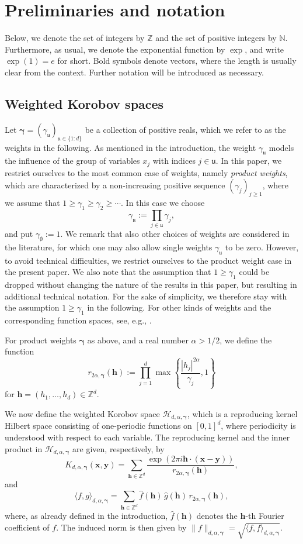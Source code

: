 \documentclass[pdflatex,sn-basic,Numbered]{sn-jnl}%
\newcommand{\bsh}{\boldsymbol{h}}
\newcommand{\bsx}{\boldsymbol{x}}
\newcommand{\bsy}{\boldsymbol{y}}
\newcommand{\bsgamma}{\boldsymbol{\gamma}}
\newcommand{\NN}{\mathbb{N}}
\newcommand{\ZZ}{\mathbb{Z}}
\newcommand{\Hcal}{\mathcal{H}}
\newcommand{\abs}[1]{\left\vert#1\right\vert}
\theoremstyle{thmstyleone}%
\theoremstyle{thmstyletwo}%
\begin{document}
\section{Preliminaries and notation}\label{sec:preliminaries}

Below, we denote the set of integers by $\ZZ$ and the set of positive integers by $\NN$. Furthermore, as usual, we denote the exponential function by $\exp$, and write $\exp(1)=e$ for short. Bold symbols denote vectors, where the length is usually clear from the context. Further notation will be introduced as necessary.

\subsection{Weighted Korobov spaces}
Let $\bsgamma=(\gamma_{\mathfrak{u}})_{\mathfrak{u}\in\{1{:}d\}}$ be a collection of positive reals, which we refer to as the weights in the following. As mentioned in the introduction, the weight $\gamma_{\mathfrak{u}}$ models the influence of the group of variables $x_j$ with indices $j\in \mathfrak{u}$. In this paper, we restrict ourselves to the most common case of weights, namely \textit{product weights}, 
which are characterized by a non-increasing positive sequence $(\gamma_j)_{j\ge 1}$, where we assume that $1\ge \gamma_1 \ge \gamma_2 \ge \cdots$. In this case we choose 
\[
\gamma_{\mathfrak{u}}:=\prod_{j\in \mathfrak{u}} \gamma_j,
\]
and put $\gamma_{\emptyset}:=1$.
We remark that also other choices of weights are considered in the literature, for which one may also allow single weights $\gamma_{\mathfrak{u}}$ to be zero. However, to avoid technical difficulties, we restrict ourselves to the product weight case in the present paper. We also note that the assumption that $1\ge \gamma_1$ could be dropped without changing the nature of the results in this paper, but resulting in additional technical notation. For the sake of simplicity, we therefore stay with the assumption $1\ge \gamma_1$ in the following. For other kinds of weights and the corresponding function spaces, see, e.g., \cite{dick2022lattice, kuo2013high}.

For product weights $\bsgamma$ as above, and a real number $\alpha>1/2$, we define the function
\[
r_{2\alpha,\bsgamma} (\bsh):=\prod_{j=1}^d \max \left\{\frac{\abs{h_j}^{2\alpha}}{\gamma_j}, 1\right\}
\]
for $\bsh=(h_1,\ldots,h_d)\in \ZZ^d$. 

We now define the weighted Korobov space $\Hcal_{d,\alpha,\bsgamma}$, which is a reproducing kernel Hilbert space consisting of one-periodic functions on $[0,1]^d$, where periodicity is understood with respect to each variable. The reproducing kernel and the inner product in $\Hcal_{d,\alpha,\bsgamma}$ are given, respectively, by
\[ K_{d, \alpha, \bsgamma}(\bsx, \bsy)=\sum_{\bsh \in \ZZ^{d}} \frac{\exp (2 \pi i \bsh \cdot(\bsx-\bsy))}{r_{2\alpha,\bsgamma}(\bsh)}, \]
and
\[ \langle f, g\rangle_{d, \alpha, \bsgamma}=\sum_{\bsh \in \ZZ^{d}}\hat{f}(\bsh)\, \overline{\hat{g}(\bsh)}\, r_{2\alpha,\bsgamma}(\bsh), \] 
where, as already defined in the introduction, $\widehat{f}({\bsh})$ denotes the $\bsh$-th Fourier coefficient of $f$.
The induced norm is then given by $\|f\|_{d,\alpha,\bsgamma}=\sqrt{\langle f, f\rangle_{d, \alpha, \bsgamma}}$.
\end{document}
